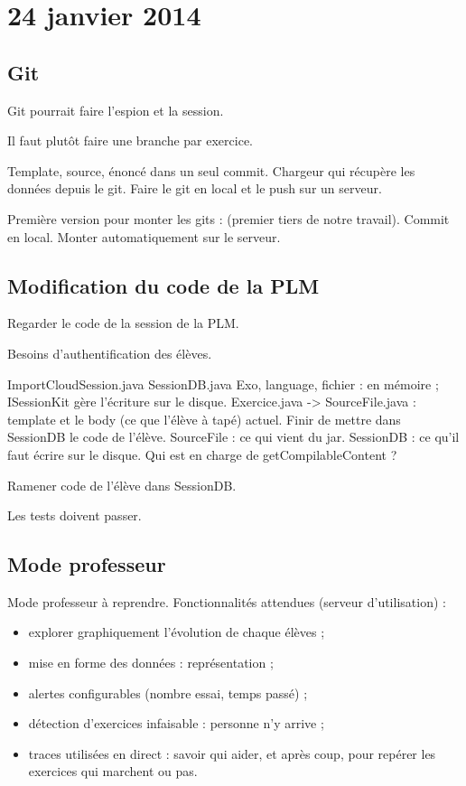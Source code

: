 \documentclass[12pt,a4paper]{article}
\begin{document}
\section{24 janvier 2014}
\subsection{Git}
Git pourrait faire l'espion et la session.

Il faut plutôt faire une branche par exercice.

Template, source, énoncé dans un seul commit.
Chargeur qui récupère les données depuis le git.
Faire le git en local et le push sur un serveur. 

Première version pour monter les gits : (premier tiers de notre travail). Commit en local. Monter automatiquement sur le serveur.
\subsection{Modification du code de la PLM}
Regarder le code de la session de la PLM.

Besoins d'authentification des élèves.

ImportCloudSession.java
SessionDB.java Exo, language, fichier : en mémoire ; ISessionKit gère l'écriture sur le disque.
Exercice.java -> SourceFile.java : template et le body (ce que l'élève à tapé) actuel.
Finir de mettre dans SessionDB le code de l'élève.
SourceFile : ce qui vient du jar.
SessionDB : ce qu'il faut écrire sur le disque.
Qui est en charge de getCompilableContent ?

Ramener code de l'élève dans SessionDB.

Les tests doivent passer.

\subsection{Mode professeur}
Mode professeur à reprendre. Fonctionnalités attendues (serveur d'utilisation) :
\begin{itemize}
\item explorer graphiquement l'évolution de chaque élèves ;
\item mise en forme des données : représentation ;
\item alertes configurables (nombre essai, temps passé) ;
\item détection d'exercices infaisable : personne n'y arrive ;
\item traces utilisées en direct : savoir qui aider, et après coup, pour repérer les exercices qui marchent ou pas.
\end{itemize}
\end{document}
